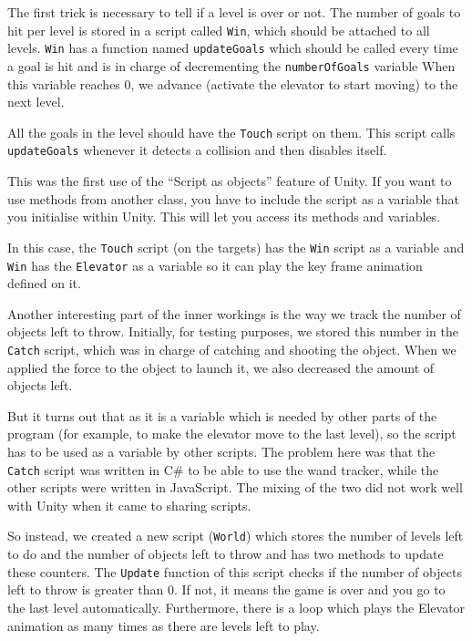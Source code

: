 \documentclass[a4paper]{article}
\begin{document}
The first trick is necessary to tell if a level is over or not. The number of goals to
hit per level is stored in a script called \verb!Win!, which should be attached to
all levels. \verb!Win! has a function named \verb!updateGoals! which should be called
every time a goal is hit and is in charge of decrementing the \verb!numberOfGoals! variable
When this variable reaches 0, we advance (activate the elevator to start moving) to the
next level.

All the goals in the level should have the \verb!Touch! script on them. This script calls
\verb!updateGoals! whenever it detects a collision and then disables itself.

This was the first use of the ``Script as objects'' feature of Unity. If you want
to use methods from another class, you have to include the script as a variable
that you initialise within Unity. This will let you access its methods and variables.

In this case, the \verb!Touch! script (on the targets) has the \verb!Win! script as a
variable and \verb!Win! has the \verb!Elevator! as a variable so it can play the key
frame animation defined on it.

Another interesting part of the inner workings is the way we track the number of
objects left to throw. Initially, for testing purposes, we stored this number in the
\verb!Catch! script, which was in charge of catching and shooting the object. When
we applied the force to the object to launch it, we also decreased the amount of
objects left.

But it turns out that as it is a variable which is needed by other parts of the
program (for example, to make the elevator move to the last level), so the script
has to be used as a variable by other scripts. The problem here was that the
\verb!Catch! script was written in C\# to be able to use the wand tracker, while
the other scripts were written in JavaScript. The mixing of the two did not work
well with Unity when it came to sharing scripts.

So instead, we created a new script (\verb!World!) which stores the number of levels
left to do and the number of objects left to throw and has two methods to update
these counters. The \verb!Update! function of this script checks if the number of
objects left to throw is greater than 0. If not, it means the game is over and you
go to the last level automatically. Furthermore, there is a loop which plays the
Elevator animation as many times as there are levels left to play.
\end{document}
